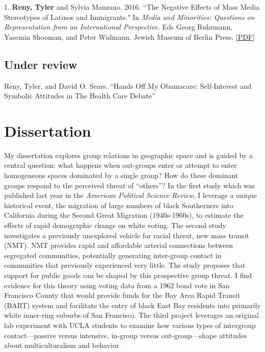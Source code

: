 \documentclass[11pt, a4paper]{article}
\newcommand{\years}[1]{\marginnote{\scriptsize #1}}
\begin{document}
\years{2016} 1. \textbf{Reny, Tyler} and Sylvia Manzano. 2016. ``The Negative Effects of Mass Media Stereotypes of Latinos and Immigrants." In \textit{Media and Minorities: Questions on Representation from an International Perspective}. Eds Georg Ruhrmann, Yasemin Shooman, and Peter Widmann. Jewish Museum of Berlin Press. \href{http://tylerreny.github.io/pdf/pubs/reny_manzano_stereotypes_2016.pdf}{[PDF]}\\

\subsection*{Under review}

\years{} Reny, Tyler, and David O. Sears. ``Hands Off My Obamacare: Self-Interest and Symbolic Attitudes in The Health Care Debate''\\

\section*{Dissertation}

My dissertation explores group relations in geographic space and is guided by a central question: what happens when out-groups enter or attempt to enter homogeneous spaces dominated by a single group? How do these dominant groups respond to the perceived threat of “others”? In the first study which was published last year in the \textit{American Political Science Review}, I leverage a unique historical event, the migration of large numbers of black Southerners into California during the Second Great Migration (1940s-1960s), to estimate the effects of rapid demographic change on white voting. The second study investigates a previously unexplored vehicle for racial threat, new mass transit (NMT). NMT provides rapid and affordable arterial connections between segregated communities, potentially generating inter-group contact in communities that previously experienced very little. The study proposes that support for public goods can be shaped by this prospective group threat. I find evidence for this theory using voting data from a 1962 bond vote in San Francisco County that would provide funds for the Bay Area Rapid Transit (BART) system and facilitate the entry of black East Bay residents into primarily white inner-ring suburbs of San Francisco. The third project leverages an original lab experiment with UCLA students to examine how various types of intergroup contact---passive versus intensive, in-group versus out-group---shape attitudes about multiculturalism and behavior. 
\end{document}
